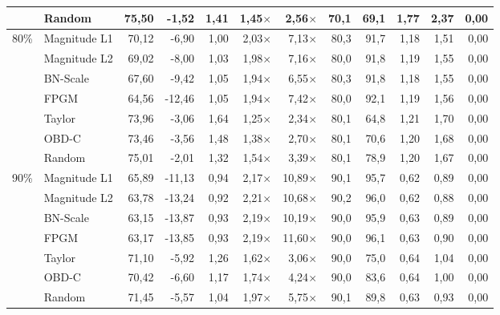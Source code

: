 \begin{table}[H]
{{\begin{tabular}{c l rr rrr rr rrr}
     & Random & 75,50 & -1,52 & 1,41 & 1,45$\times$ & 2,56$\times$ & 70,1 & 69,1 & 1,77 & 2,37 & 0,00 \\
    \midrule
    \multirow{7}{*}{80\%} & Magnitude L1 & 70,12 & -6,90 & 1,00 & 2,03$\times$ & 7,13$\times$ & 80,3 & 91,7 & 1,18 & 1,51 & 0,00 \\
     & Magnitude L2 & 69,02 & -8,00 & 1,03 & 1,98$\times$ & 7,16$\times$ & 80,0 & 91,8 & 1,19 & 1,55 & 0,00 \\
     & BN-Scale & 67,60 & -9,42 & 1,05 & 1,94$\times$ & 6,55$\times$ & 80,3 & 91,8 & 1,18 & 1,55 & 0,00 \\
     & FPGM & 64,56 & -12,46 & 1,05 & 1,94$\times$ & 7,42$\times$ & 80,0 & 92,1 & 1,19 & 1,56 & 0,00 \\
     & Taylor & 73,96 & -3,06 & 1,64 & 1,25$\times$ & 2,34$\times$ & 80,1 & 64,8 & 1,21 & 1,70 & 0,00 \\
     & OBD-C & 73,46 & -3,56 & 1,48 & 1,38$\times$ & 2,70$\times$ & 80,1 & 70,6 & 1,20 & 1,68 & 0,00 \\
     & Random & 75,01 & -2,01 & 1,32 & 1,54$\times$ & 3,39$\times$ & 80,1 & 78,9 & 1,20 & 1,67 & 0,00 \\
    \midrule
    \multirow{7}{*}{90\%} & Magnitude L1 & 65,89 & -11,13 & 0,94 & 2,17$\times$ & 10,89$\times$ & 90,1 & 95,7 & 0,62 & 0,89 & 0,00 \\
     & Magnitude L2 & 63,78 & -13,24 & 0,92 & 2,21$\times$ & 10,68$\times$ & 90,2 & 96,0 & 0,62 & 0,88 & 0,00 \\
     & BN-Scale & 63,15 & -13,87 & 0,93 & 2,19$\times$ & 10,19$\times$ & 90,0 & 95,9 & 0,63 & 0,89 & 0,00 \\
     & FPGM & 63,17 & -13,85 & 0,93 & 2,19$\times$ & 11,60$\times$ & 90,0 & 96,1 & 0,63 & 0,90 & 0,00 \\
     & Taylor & 71,10 & -5,92 & 1,26 & 1,62$\times$ & 3,06$\times$ & 90,0 & 75,0 & 0,64 & 1,04 & 0,00 \\
     & OBD-C & 70,42 & -6,60 & 1,17 & 1,74$\times$ & 4,24$\times$ & 90,0 & 83,6 & 0,64 & 1,00 & 0,00 \\
     & Random & 71,45 & -5,57 & 1,04 & 1,97$\times$ & 5,75$\times$ & 90,1 & 89,8 & 0,63 & 0,93 & 0,00 \\
    \bottomrule
  \end{tabular}}}
\end{table}
